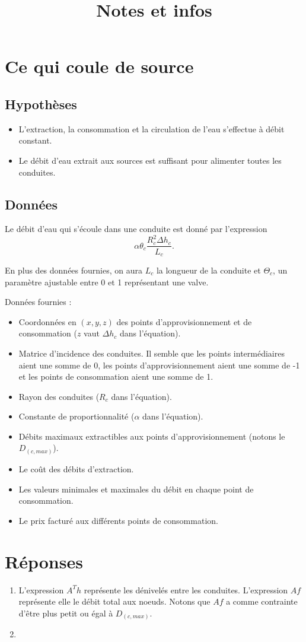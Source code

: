 \documentclass[french]{article}
\begin{document}
\title{Notes et infos}
\maketitle
\section{Ce qui coule de source}
\subsection{Hypothèses}
\begin{itemize}
	\item
		L'extraction, la consommation et la circulation de l'eau s'effectue à débit constant.
	\item
		Le débit d'eau extrait aux sources est suffisant pour alimenter toutes les conduites.
\end{itemize}
\subsection{Données}
Le débit d'eau qui s'écoule dans une conduite est donné par l'expression $$\alpha\theta_c\frac{R^2_c\Delta h_c}{L_c}.$$

En plus des données fournies, on aura $L_c$ la longueur de la conduite et $\Theta_c$, un paramètre ajustable entre 0 et 1 représentant une valve.

Données fournies :
\begin{itemize}
	\item 
		Coordonnées en $(x,y,z)$ des points d'approvisionnement et de consommation ($z$ vaut $\Delta h_c$ dans l'équation).
	\item 
		Matrice d'incidence des conduites.
		Il semble que les points intermédiaires aient une somme de 0, les points d'approvisionnement aient une somme de -1 et les points de consommation aient une somme de 1.
	\item
		Rayon des conduites ($R_c$ dans l'équation).
	\item
		Constante de proportionnalité ($\alpha$ dans l'équation).
	\item
		Débits maximaux extractibles aux points d'approvisionnement (notons le $D_(c,max)$).
	\item 
		Le coût des débits d'extraction.
	\item 
		Les valeurs minimales et maximales du débit en chaque point de consommation.
	\item 
		Le prix facturé aux différents points de consommation.
\end{itemize}
\section{Réponses}
\begin{enumerate}
	\item 
		L'expression $A^T h$ représente les dénivelés entre les conduites.
		L'expression $Af$ représente elle le débit total aux noeuds.
		Notons que $Af$ a comme contrainte d'être plus petit ou égal à $D_(c,max)$.
	\item 
		
\end{enumerate}
\end{document}
